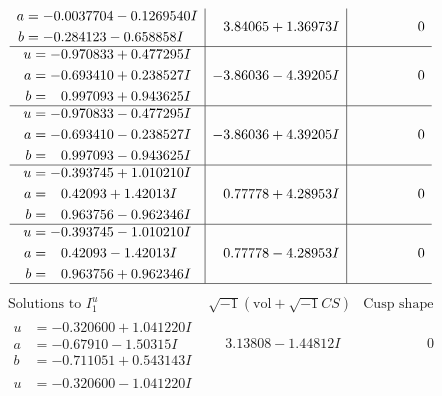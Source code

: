 \documentclass[1p]{elsarticle_modified}
\theoremstyle{definition}
\newcommand{\I}{\sqrt{-1}}
\begin{document}
$$\begin{array}{c|c|c}
\begin{aligned}
a &= -0.0037704 - 0.1269540 I \\
b &= -0.284123 - 0.658858 I\end{aligned}
 & \phantom{-}3.84065 + 1.36973 I & \phantom{-0.000000 } 0 \\ \hline\begin{aligned}
u &= -0.970833 + 0.477295 I \\
a &= -0.693410 + 0.238527 I \\
b &= \phantom{-}0.997093 + 0.943625 I\end{aligned}
 & -3.86036 - 4.39205 I & \phantom{-0.000000 } 0 \\ \hline\begin{aligned}
u &= -0.970833 - 0.477295 I \\
a &= -0.693410 - 0.238527 I \\
b &= \phantom{-}0.997093 - 0.943625 I\end{aligned}
 & -3.86036 + 4.39205 I & \phantom{-0.000000 } 0 \\ \hline\begin{aligned}
u &= -0.393745 + 1.010210 I \\
a &= \phantom{-}0.42093 + 1.42013 I \\
b &= \phantom{-}0.963756 - 0.962346 I\end{aligned}
 & \phantom{-}0.77778 + 4.28953 I & \phantom{-0.000000 } 0 \\ \hline\begin{aligned}
u &= -0.393745 - 1.010210 I \\
a &= \phantom{-}0.42093 - 1.42013 I \\
b &= \phantom{-}0.963756 + 0.962346 I\end{aligned}
 & \phantom{-}0.77778 - 4.28953 I & \phantom{-0.000000 } 0\\
 \hline 
 \end{array}$$\newpage$$\begin{array}{c|c|c}  
\text{Solutions to }I^u_{1}& \I (\text{vol} + \sqrt{-1}CS) & \text{Cusp shape}\\
 \hline 
\begin{aligned}
u &= -0.320600 + 1.041220 I \\
a &= -0.67910 - 1.50315 I \\
b &= -0.711051 + 0.543143 I\end{aligned}
 & \phantom{-}3.13808 - 1.44812 I & \phantom{-0.000000 } 0 \\ \hline\begin{aligned}
u &= -0.320600 - 1.041220 I \\

\end{aligned}
\end{array}$$
\end{document}
